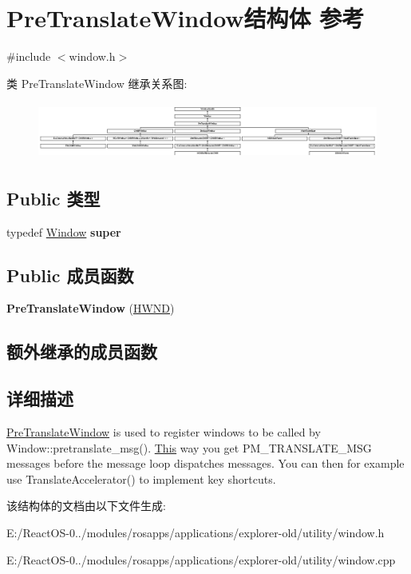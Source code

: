 \hypertarget{struct_pre_translate_window}{}\section{Pre\+Translate\+Window结构体 参考}
\label{struct_pre_translate_window}


{\ttfamily \#include $<$window.\+h$>$}

类 Pre\+Translate\+Window 继承关系图\+:\begin{figure}[H]
\begin{center}
\leavevmode
\includegraphics[height=1.893720cm]{struct_pre_translate_window}
\end{center}
\end{figure}
\subsection*{Public 类型}
\begin{DoxyCompactItemize}
\item 
\mbox{\label{struct_pre_translate_window_a2663a632fb72fd4d748f6532c440ac1a}} 
typedef \hyperlink{struct_window}{Window} {\bfseries super}
\end{DoxyCompactItemize}
\subsection*{Public 成员函数}
\begin{DoxyCompactItemize}
\item 
\mbox{\label{struct_pre_translate_window_a28bf2db728a6617dc6cbc1a944290350}} 
{\bfseries Pre\+Translate\+Window} (\hyperlink{interfacevoid}{H\+W\+ND})
\end{DoxyCompactItemize}
\subsection*{额外继承的成员函数}


\subsection{详细描述}
\hyperlink{struct_pre_translate_window}{Pre\+Translate\+Window} is used to register windows to be called by Window\+::pretranslate\+\_\+msg(). \hyperlink{namespace_this}{This} way you get P\+M\+\_\+\+T\+R\+A\+N\+S\+L\+A\+T\+E\+\_\+\+M\+SG messages before the message loop dispatches messages. You can then for example use Translate\+Accelerator() to implement key shortcuts. 

该结构体的文档由以下文件生成\+:\begin{DoxyCompactItemize}
\item 
E\+:/\+React\+O\+S-\/0../modules/rosapps/applications/explorer-\/old/utility/window.\+h\item 
E\+:/\+React\+O\+S-\/0../modules/rosapps/applications/explorer-\/old/utility/window.\+cpp\end{DoxyCompactItemize}
